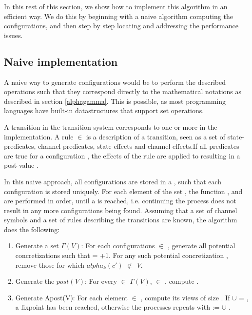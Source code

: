 In this rest of this section, we show how to implement this algorithm in an efficient way. We do this by beginning with a naive algorithm computing the configurations, and then step by step locating and addressing the performance issues. 



\subsection{Naive implementation}
A naive way to generate configurations would be to perform the described operations such that they correspond directly to the mathematical notations as described in section \ref{alphagamma}. This is possible, as most programming languages have built-in datastructures that support set operations.

A transition in the transition system corresponds to one or more  in the implementation. A rule  $\in$  is a description of a transition, seen as a set of state-predicates, channel-predicates, state-effects and channel-effects.If all predicates are true for a configuration , the effects of the rule are applied to  resulting in a post-value .

In this naive approach, all configurations are stored in a , such that each configuration is stored uniquely. For each element  of the set , the function ,  and  are performed in order, until a  is reached, i.e. continuing the process does not result in any more configurations being found. Assuming that a set of channel symbols and a set of rules  describing the transitions are known, the algorithm does the following:

\begin{enumerate}
\item
Generate a set $\Gamma(V)$: For each configurations  $\in$ , generate all potential concretizations  such that  = +1. For any such potential concretization , remove those for which $alpha_k(c')$ $\not\subset$ $V$.

\item
Generate the $post(V)$: For every  $\in$ $\Gamma(V)$,  $\in$ , compute .

\item
Generate Apost(V): For each element  $\in$ , compute its views of size . If  $\cup$  = , a fixpoint has been reached, otherwise the processes repeats with  :=  $\cup$ .
\end{enumerate}

